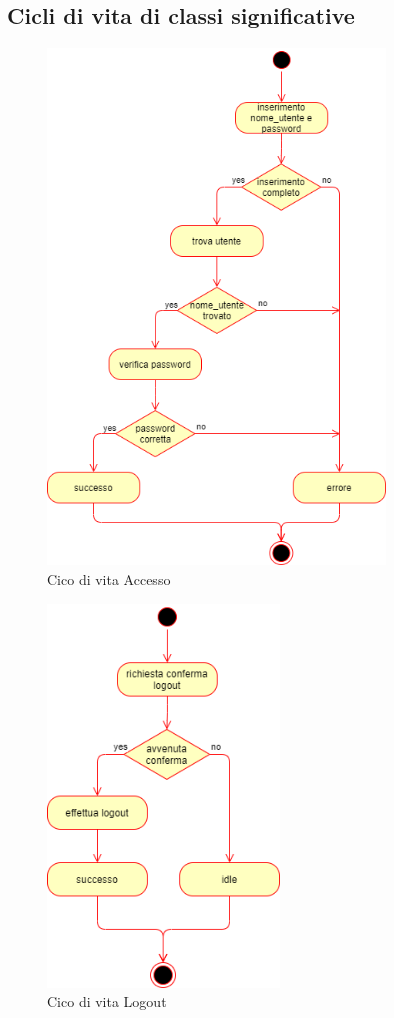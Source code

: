 \documentclass[11pt]{article}
\begin{document}
\subsection{Cicli di vita di classi significative}
\begin{figure}[H]
\centering
\includegraphics[width=0.8\textwidth]{Ciclo di vita Accesso.png}
\caption{Cico di vita Accesso}
\end{figure}

\begin{figure}[H]
\centering
\includegraphics[width=0.55\textwidth]{Ciclo di vita Logout.png}
\caption{Cico di vita Logout}
\end{figure}
\end{document}
